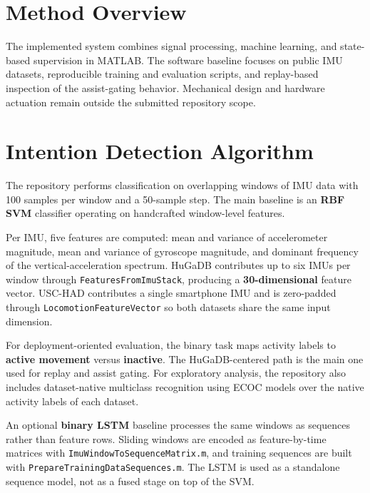 \section{Method Overview}
The implemented system combines signal processing, machine learning, and state-based supervision in MATLAB. The software baseline focuses on public IMU datasets, reproducible training and evaluation scripts, and replay-based inspection of the assist-gating behavior. Mechanical design and hardware actuation remain outside the submitted repository scope.

\section{Intention Detection Algorithm}
The repository performs classification on overlapping windows of IMU data with 100 samples per window and a 50-sample step. The main baseline is an \textbf{RBF SVM} classifier operating on handcrafted window-level features.

Per IMU, five features are computed: mean and variance of accelerometer magnitude, mean and variance of gyroscope magnitude, and dominant frequency of the vertical-acceleration spectrum. HuGaDB contributes up to six IMUs per window through \texttt{FeaturesFromImuStack}, producing a \textbf{30-dimensional} feature vector. USC-HAD contributes a single smartphone IMU and is zero-padded through \texttt{LocomotionFeatureVector} so both datasets share the same input dimension.

For deployment-oriented evaluation, the binary task maps activity labels to \textbf{active movement} versus \textbf{inactive}. The HuGaDB-centered path is the main one used for replay and assist gating. For exploratory analysis, the repository also includes dataset-native multiclass recognition using ECOC models over the native activity labels of each dataset.

An optional \textbf{binary LSTM} baseline processes the same windows as sequences rather than feature rows. Sliding windows are encoded as feature-by-time matrices with \texttt{ImuWindowToSequenceMatrix.m}, and training sequences are built with \texttt{PrepareTrainingDataSequences.m}. The LSTM is used as a standalone sequence model, not as a fused stage on top of the SVM.

